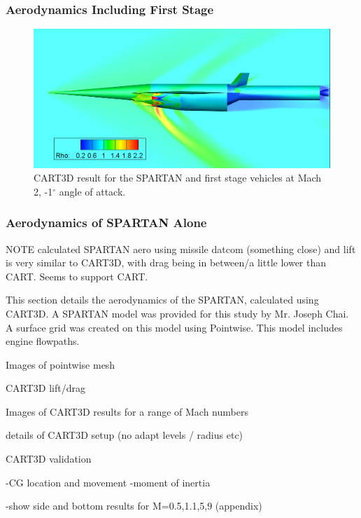   \subsubsection{Aerodynamics Including First Stage}
		

\begin{figure}
\centering
\includegraphics[width=0.7\linewidth]{figures/3_vehicle_design/CARTcontour}
\caption{CART3D result for the SPARTAN and first stage vehicles at Mach 2, -1$^\circ$ angle of attack.}
\label{fig:CARTcontour}
\end{figure}




  \subsubsection{Aerodynamics of SPARTAN Alone}
  
  NOTE calculated SPARTAN aero using missile datcom (something close) and lift is very similar to CART3D, with drag being in between/a little lower than CART. Seems to support CART. 
  
  
This section details the aerodynamics of the SPARTAN, calculated using CART3D. A SPARTAN model was provided for this study by Mr. Joseph Chai. A surface grid was created on this model using Pointwise\cite{Pointwise}. This model includes engine flowpaths. 

Images of pointwise mesh

CART3D lift/drag 

Images of CART3D results for a range of Mach numbers

details of CART3D setup (no adapt levels / radius etc)

CART3D validation

-CG location and movement
-moment of inertia

-show side and bottom results for M=0.5,1.1,5,9 (appendix)

